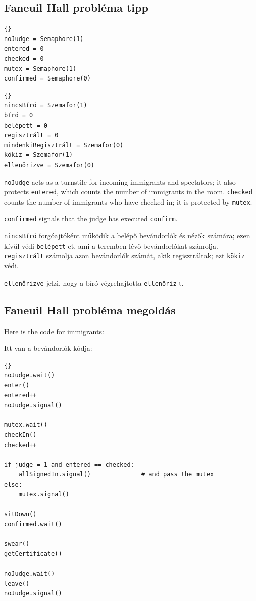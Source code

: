 \documentclass{book}
\newcommand{\clearemptydoublepage}{\newpage\cleardoublepage}
\begin{document}
\clearemptydoublepage
\subsection{Faneuil Hall probléma tipp}

\begin{lstlisting}[title={Faneuil Hall problem hint}]{}
noJudge = Semaphore(1)
entered = 0
checked = 0
mutex = Semaphore(1)
confirmed = Semaphore(0)
\end{lstlisting}

\begin{lstlisting}[title={Faneuil Hall probléma tipp}]{}
nincsBíró = Szemafor(1)
bíró = 0
belépett = 0
regisztrált = 0
mindenkiRegisztrált = Szemafor(0)
kökiz = Szemafor(1)
ellenőrizve = Szemafor(0)
\end{lstlisting}

{\tt noJudge} acts as a turnstile for incoming immigrants and
spectators; it also protects {\tt entered}, which counts the
number of immigrants in the room.  {\tt checked} counts the
number of immigrants who have checked in; it is protected by
{\tt mutex}.

{\tt confirmed} signals that the judge has executed {\tt confirm}.

{\tt nincsBíró} forgóajtóként működik a belépő
bevándorlók és nézők számára; ezen kívül védi {\tt belépett}-et, ami a
teremben lévő bevándorlókat számolja. {\tt regisztrált} számolja
azon bevándorlók számát, akik regisztráltak; ezt
{\tt kökiz} védi.

{\tt ellenőrizve} jelzi, hogy a bíró végrehajtotta {\tt ellenőriz}-t.

\clearemptydoublepage
\subsection{Faneuil Hall probléma megoldás}

Here is the code for immigrants:

Itt van a bevándorlók kódja:

\begin{lstlisting}[title={Faneuil Hall problem solution (immigrant)}]{}
noJudge.wait()
enter()
entered++
noJudge.signal()

mutex.wait()
checkIn()
checked++

if judge = 1 and entered == checked:
    allSignedIn.signal()              # and pass the mutex
else:
    mutex.signal()

sitDown()
confirmed.wait()

swear()
getCertificate()

noJudge.wait()
leave()
noJudge.signal()
\end{lstlisting}
\end{document}
